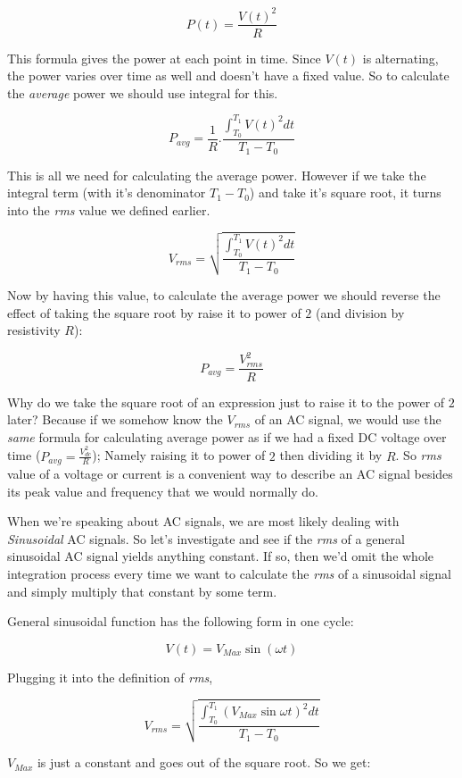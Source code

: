 \documentclass{article}
\begin{document}
	$$P(t) = \frac{V(t)^2}{R}$$
	
	This formula gives the power at each point in time.
	Since $V(t)$ is alternating, the power varies over time as well and doesn't have a fixed value.
	So to calculate the \textit{average} power we should use integral for this.
	
	$$P_{avg} = \frac{1}{R}.\frac{\int_{T_0}^{T_1} V(t)^2 dt }{T_1 - T_0}$$
	
	This is all we need for calculating the average power.
	However if we take the integral term (with it's denominator $T_1 - T_0$) and take it's square root, it turns into the \textit{rms} value we defined earlier.
	
	$$V_{rms} = \sqrt{\frac{\int_{T_0}^{T_1} V(t)^2 dt }{T_1 - T_0}} $$
	
	Now by having this value, to calculate the average power we should reverse the effect of taking the square root by raise it to power of $2$ (and division by resistivity $R$):
	
	$$ P_{avg} = \frac{V^2_{rms}}{R} $$
	
	Why do we take the square root of an expression just to raise it to the power of $2$ later?
	Because if we somehow know the $V_{rms}$ of an AC signal, we would use the \textit{same} formula for calculating average power as if we had a fixed DC voltage over time ($P_{avg} = \frac{V^2_{dc}}{R}$); Namely raising it to power of $2$ then dividing it by $R$.
	So \textit{rms} value of a voltage or current is a convenient way to describe an AC signal besides its peak value and frequency that we would normally do.
	
	When we're speaking about AC signals, we are most likely dealing with \textit{Sinusoidal} AC signals. 
	So let's investigate and see if the \textit{rms} of a general sinusoidal AC signal yields anything constant. 
	If so, then we'd omit the whole integration process every time we want to calculate the \textit{rms} of a sinusoidal signal and simply multiply that constant by some term.
	
	General sinusoidal function has the following form in one cycle:
	
	$$ V(t) = V_{Max} \sin(\omega t) $$
	
	Plugging it into the definition of \textit{rms},
	
	$$V_{rms} = \sqrt{\frac{\int_{T_0}^{T_1} (V_{Max} \sin \omega t) ^ 2 dt} {T_1 - T_0}}$$
	
	$V_{Max}$ is just a constant and goes out of the square root. So we get:
	
\end{document}
